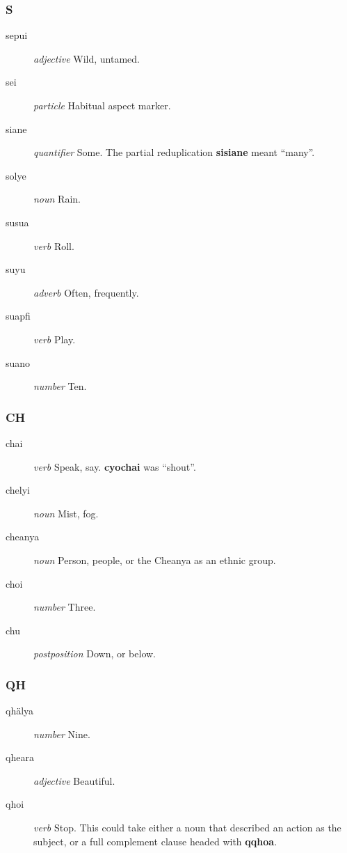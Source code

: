 \documentclass{article}
\begin{document}
\subsubsection{S}

\begin{description}
\item [sepui] \emph{adjective} Wild, untamed.
\item [sei] \emph{particle} Habitual aspect marker.
\item [siane] \emph{quantifier} Some.  The partial reduplication \textbf{sisiane} meant ``many''.
\item [solye] \emph{noun} Rain.
\item [susua] \emph{verb} Roll.
\item [suyu] \emph{adverb} Often, frequently.
\item [suapfi] \emph{verb} Play.
\item [suano] \emph{number} Ten.
\end{description}

\subsubsection{CH}

\begin{description}
\item [chai] \emph{verb} Speak, say.  \textbf{cyochai} was ``shout''.
\item [chelyi] \emph{noun} Mist, fog.
\item [cheanya] \emph{noun} Person, people, or the Cheanya as an ethnic group.
\item [choi] \emph{number} Three.
\item [chu] \emph{postposition} Down, or below.
\end{description}

\subsubsection{QH}

\begin{description}
\item [qh\"alya] \emph{number} Nine.
\item [qheara] \emph{adjective} Beautiful.
\item [qhoi] \emph{verb} Stop.  This could take either a noun that described an action as the subject, or a full complement clause headed with \textbf{qqhoa}.
\end{description}
\end{document}
